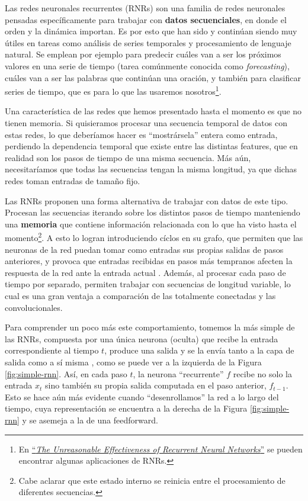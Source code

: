 \documentclass[../../main.tex]{subfiles}
\begin{document}
Las redes neuronales recurrentes (RNRs) son una familia de redes neuronales pensadas
específicamente para trabajar con \textbf{datos secuenciales}, en donde el orden y la
dinámica importan. Es por esto que han sido y continúan siendo muy útiles en tareas como
análisis de series temporales y procesamiento de lenguaje natural. Se emplean por ejemplo
para predecir cuáles van a ser los próximos valores en una serie de tiempo (tarea
comúnmente conocida como \textit{forecasting}), cuáles van a ser las palabras que
continúan una oración, y también para clasificar series de tiempo, que es para lo que las
usaremos nosotros\footnote{En
\href{https://karpathy.github.io/2015/05/21/rnn-effectiveness/}{``\textit{The Unreasonable
Effectiveness of Recurrent Neural Networks}''} se pueden encontrar algunas aplicaciones de
RNRs.}.

Una característica de las redes que hemos presentado hasta el momento es que no tienen
memoria. Si quisieramos procesar una secuencia temporal de datos con estas redes, lo que
deberíamos hacer es ``mostrársela'' entera como entrada, perdiendo la dependencia temporal
que existe entre las distintas features, que en realidad son los pasos de tiempo de una
misma secuencia. Más aún, necesitaríamos que todas las secuencias tengan la misma
longitud, ya que dichas redes toman entradas de tamaño fijo.

Las RNRs proponen una forma alternativa de trabajar con datos de este tipo. Procesan las
secuencias iterando sobre los distintos pasos de tiempo manteniendo una \textbf{memoria}
que contiene información relacionada con lo que ha visto hasta el momento\footnote{Cabe
aclarar que este estado interno se reinicia entre el procesamiento de diferentes
secuencias.}. A esto lo logran introduciendo cíclos en su grafo, que permiten que las
neuronas de la red puedan tomar como entradas sus propias salidas de pasos anteriores, y
provoca que entradas recibidas en pasos más tempranos afecten la respuesta de la red ante
la entrada actual \cite{ai-a-modern-approach}. Además, al procesar cada paso de tiempo por
separado, permiten trabajar con secuencias de longitud variable, lo cual es una gran
ventaja a comparación de las totalmente conectadas y las convolucionales.

Para comprender un poco más este comportamiento, tomemos la más simple de las RNRs,
compuesta por una única neurona (oculta) que recibe la entrada correspondiente al tiempo
\(t\), produce una salida y se la envía tanto a la capa de salida como a sí misma
\cite{hands-on-ML-sklearn-tf}, como se puede ver a la izquierda de la Figura
\ref{fig:simple-rnn}. Así, en cada paso \(t\), la neurona ``recurrente'' \(f\)
recibe no solo la entrada \(x_t\) sino también su propia salida computada en el paso
anterior, \(f_{t-1}\). Esto se hace aún más evidente cuando ``desenrollamos'' la red a lo
largo del tiempo, cuya representación se encuentra a la derecha de la Figura
\ref{fig:simple-rnn} y se asemeja a la de una feedforward.
\end{document}
